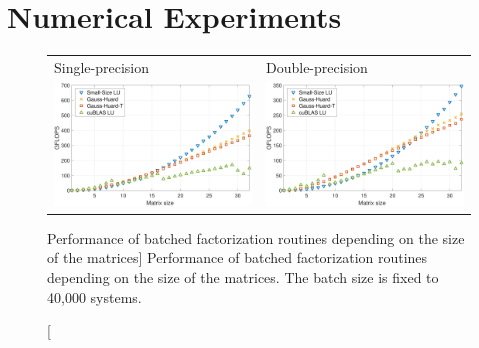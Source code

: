 \section{Numerical Experiments}
\label{2017-lu-block-jacobi:sec:experiments}

\begin{figure}[t]
\begin{center}
\begin{tabular}{ll}
\hline
Single-precision & Double-precision\\
\includegraphics[width=.45\columnwidth]{plots/incsize_single.pdf}
&
\includegraphics[width=.45\columnwidth]{plots/incsize_double.pdf}\\
\end{tabular}
\end{center}
\caption
[Performance of batched factorization routines depending on the size of the
matrices]
{%
Performance of batched factorization routines depending on the size of the matrices.
The batch size is fixed to 40,000 systems.
}
\label{2017-lu-block-jacobi:fig:performanceincsize}
\end{figure}


